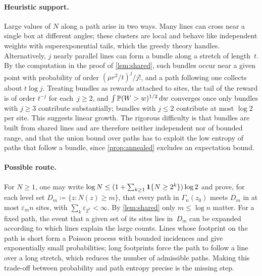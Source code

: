 \documentclass[11pt,letterpaper]{article}
\begin{document}
\paragraph{Heuristic support.} Large values of $N$ along a path arise in two ways. Many lines can cross near a single box at different angles; these clusters are local and behave like independent weights with superexponential tails, which the greedy theory handles. Alternatively, $j$ nearly parallel lines can form a bundle along a stretch of length~$t$. By the computation in the proof of \cref{lem:shared}, such bundles occur near a given point with probability of order $(\mu r^2/t)^j/j!$, and a path following one collects about $t\log j$. Treating bundles as rewards attached to sites, the tail of the reward is of order $t^{-j}$ for each~$j\ge2$, and $\int\mathbb P(W>w)^{1/2}\,\mathrm{d} w$ converges once only bundles with $j\ge3$ contribute substantially; bundles with $j\le2$ contribute at most $\log2$ per site. This suggests linear growth. The rigorous difficulty is that bundles are built from shared lines and are therefore neither independent nor of bounded range, and that the union bound over paths has to exploit the low entropy of paths that follow a bundle, since \cref{prop:annealed} excludes an expectation bound.

\paragraph{Possible route.} For $N\ge1$, one may write $\log N\le(1+\sum_{k\ge1}\mathbf{1}\{N\ge2^k\})\log 2$ and prove, for each level set $D_m\coloneqq\{z\colon N(z)\ge m\}$, that every path in $\Gamma_n(z_0)$ meets $D_m$ in at most $\varepsilon_mn$ sites, with $\sum_k\varepsilon_{2^k}<\infty$. By \cref{lem:shared} only $m\le\log n$ matter. For a fixed path, the event that a given set of its sites lies in~$D_m$ can be expanded according to which lines explain the large counts. Lines whose footprint on the path is short form a Poisson process with bounded incidences and give exponentially small probabilities; long footprints force the path to follow a line over a long stretch, which reduces the number of admissible paths. Making this trade-off between probability and path entropy precise is the missing step.
\end{document}
